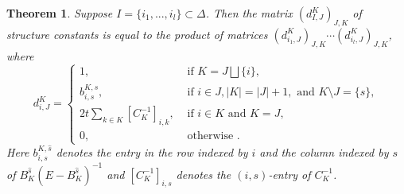 \documentclass[11pt, letterpaper]{amsart}
\numberwithin{equation}{section}
\newtheorem{theorem}{Theorem}[section]
\begin{document}
\begin{theorem}\label{thm-main} Suppose $I=\{i_1, ..., i_l\} \subset\Delta$. Then the matrix $(d^K_{I, J})_{J, K}$ of structure constants is equal to the product of matrices $(d^{K}_{i_1, J})_{J, K}\cdots (d^{K}_{i_l, J})_{J, K}$, where 
\begin{equation}\label{eq-def of matrix}
d^{K}_{i, J}=\begin{cases}
    1, &\text{ if } K=J \bigsqcup \{i\},\\
    b^{K, \widehat{s}}_{i, s}, &\text{ if } i\in J, |K|=|J|+1, \text{ and } K\setminus J=\{s\},\\
    2t\sum_{k\in K}[C_K^{-1}]_{i,k}, &\text{ if } i\in K \text{ and } K=J, \\
     0, &\text{ otherwise }.
\end{cases}
\end{equation}
Here $b^{K, \widehat{s}}_{i, s}$ denotes the entry in the row indexed by $i$ and the column indexed by $s$ of
$B_K^{\widehat{s}}\left(E-B_K^{\widehat{s}}\right)^{-1}$ and $[C_K^{-1}]_{i,s}$ denotes the $(i,s)$-entry of $C_K^{-1}$.
\end{theorem}
\end{document}
